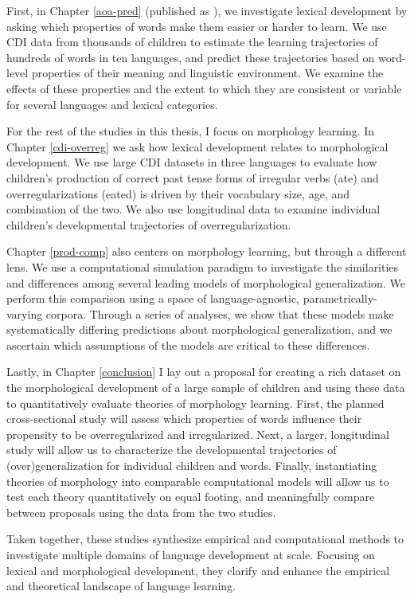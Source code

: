 \documentclass[
   11pt,
       ]{book}
\begin{document}
First, in Chapter \ref{aoa-pred} (published as \citet{braginsky2019}), we investigate lexical development by asking which properties of words make them easier or harder to learn. We use CDI data from thousands of children to estimate the learning trajectories of hundreds of words in ten languages, and predict these trajectories based on word-level properties of their meaning and linguistic environment. We examine the effects of these properties and the extent to which they are consistent or variable for several languages and lexical categories.

For the rest of the studies in this thesis, I focus on morphology learning. In Chapter \ref{cdi-overreg} we ask how lexical development relates to morphological development. We use large CDI datasets in three languages to evaluate how children's production of correct past tense forms of irregular verbs (ate) and overregularizations (eated) is driven by their vocabulary size, age, and combination of the two. We also use longitudinal data to examine individual children's developmental trajectories of overregularization.

Chapter \ref{prod-comp} also centers on morphology learning, but through a different lens. We use a computational simulation paradigm to investigate the similarities and differences among several leading models of morphological generalization. We perform this comparison using a space of language-agnostic, parametrically-varying corpora. Through a series of analyses, we show that these models make systematically differing predictions about morphological generalization, and we ascertain which assumptions of the models are critical to these differences.

Lastly, in Chapter \ref{conclusion} I lay out a proposal for creating a rich dataset on the morphological development of a large sample of children and using these data to quantitatively evaluate theories of morphology learning. First, the planned cross-sectional study will assess which properties of words influence their propensity to be overregularized and irregularized. Next, a larger, longitudinal study will allow us to characterize the developmental trajectories of (over)generalization for individual children and words. Finally, instantiating theories of morphology into comparable computational models will allow us to test each theory quantitatively on equal footing, and meaningfully compare between proposals using the data from the two studies.

Taken together, these studies synthesize empirical and computational methods to investigate multiple domains of language development at scale. Focusing on lexical and morphological development, they clarify and enhance the empirical and theoretical landscape of language learning.
\end{document}
